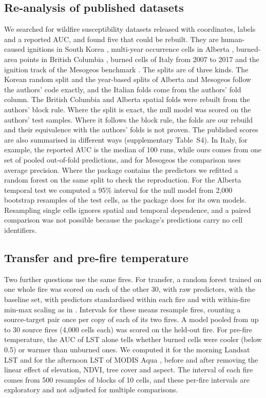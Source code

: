 \documentclass[preprint,12pt,authoryear]{elsarticle}
\begin{document}
\subsection{Re-analysis of published datasets}
\label{sec:open}

We searched for wildfire susceptibility datasets released with coordinates, labels and a reported AUC, and found five that could be rebuilt. They are human-caused ignitions in South Korea \citep{Heo2026data}, multi-year occurrence cells in Alberta \citep{Alberta2026data}, burned-area points in British Columbia \citep{Khan2026data}, burned cells of Italy from 2007 to 2017 \citep{Cilli2022,Cilli2023data} and the ignition track of the Mesogeos benchmark \citep{Kondylatos2023,Mesogeos2025data}. The splits are of three kinds. The Korean random split and the year-based splits of Alberta and Mesogeos follow the authors' code exactly, and the Italian folds come from the authors' fold column. The British Columbia and Alberta spatial folds were rebuilt from the authors' block rule. Where the split is exact, the null model was scored on the authors' test samples. Where it follows the block rule, the folds are our rebuild and their equivalence with the authors' folds is not proven. The published scores are also summarised in different ways (supplementary Table~S4). In Italy, for example, the reported AUC is the median of 100 runs, while ours comes from one set of pooled out-of-fold predictions, and for Mesogeos the comparison uses average precision. Where the package contains the predictors we refitted a random forest on the same split to check the reproduction. For the Alberta temporal test we computed a 95\% interval for the null model from 2,000 bootstrap resamples of the test cells, as the package does for its own models. Resampling single cells ignores spatial and temporal dependence, and a paired comparison was not possible because the package's predictions carry no cell identifiers.

\subsection{Transfer and pre-fire temperature}
\label{sec:secondary}

Two further questions use the same fires. For transfer, a random forest trained on one whole fire was scored on each of the other 30, with raw predictors, with the baseline set, with predictors standardised within each fire and with within-fire min-max scaling as in \citet{Dimarco2026}. Intervals for these means resample fires, counting a source-target pair once per copy of each of its two fires. A model pooled from up to 30 source fires (4,000 cells each) was scored on the held-out fire. For pre-fire temperature, the AUC of LST alone tells whether burned cells were cooler (below 0.5) or warmer than unburned ones. We computed it for the morning Landsat LST and for the afternoon LST of MODIS Aqua \citep{MYD11A1}, before and after removing the linear effect of elevation, NDVI, tree cover and aspect. The interval of each fire comes from 500 resamples of blocks of 10 cells, and these per-fire intervals are exploratory and not adjusted for multiple comparisons.
\end{document}
